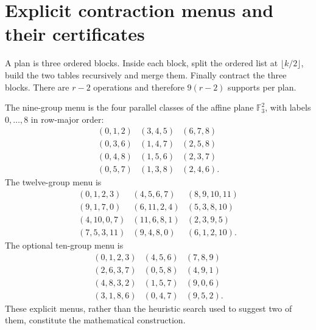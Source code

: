 \section{Explicit contraction menus and their certificates}
\label{sec:construction}


A plan is three ordered blocks. Inside each block, split the ordered list at
$\lfloor k/2\rfloor$, build the two tables recursively and merge them.
Finally contract the three blocks. There are $r-2$ operations and therefore
$9(r-2)$ supports per plan.

The nine-group menu is the four parallel classes of the affine plane
$\mathbb F_3^2$, with labels $0,\ldots,8$ in row-major order:
\[
\begin{array}{lll}
(0,1,2)&(3,4,5)&(6,7,8)\\
(0,3,6)&(1,4,7)&(2,5,8)\\
(0,4,8)&(1,5,6)&(2,3,7)\\
(0,5,7)&(1,3,8)&(2,4,6).
\end{array}
\]
The twelve-group menu is
\[
\begin{array}{lll}
(0,1,2,3)&(4,5,6,7)&(8,9,10,11)\\
(9,1,7,0)&(6,11,2,4)&(5,3,8,10)\\
(4,10,0,7)&(11,6,8,1)&(2,3,9,5)\\
(7,5,3,11)&(9,4,8,0)&(6,1,2,10).
\end{array}
\]
The optional ten-group menu is
\[
\begin{array}{lll}
(0,1,2,3)&(4,5,6)&(7,8,9)\\
(2,6,3,7)&(0,5,8)&(4,9,1)\\
(4,8,3,2)&(1,5,7)&(9,0,6)\\
(3,1,8,6)&(0,4,7)&(9,5,2).
\end{array}
\]
These explicit menus, rather than the heuristic search used to suggest two
of them, constitute the mathematical construction.

